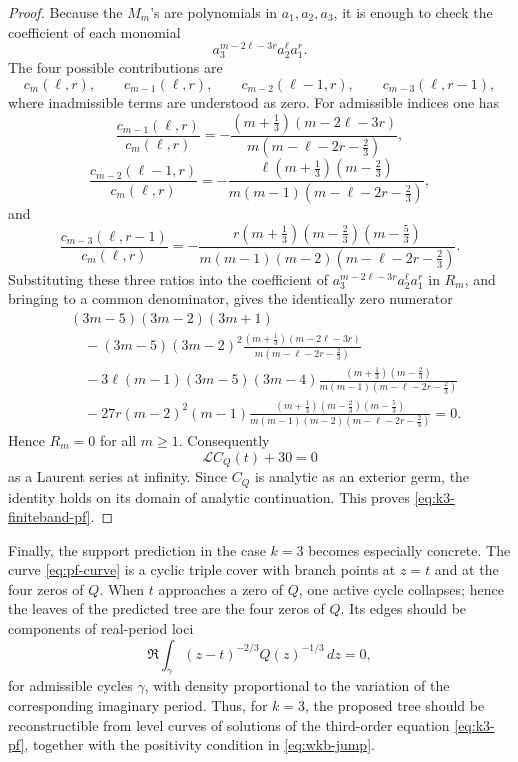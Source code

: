 \documentclass[10pt,twoside,a4paper,reqno]{amsart}
\theoremstyle{plain}
\theoremstyle{definition}
\theoremstyle{remark}
\begin{document}
\begin{proof}
Because the \(M_m\)'s are polynomials in \(a_1,a_2,a_3\), it is enough to check
the coefficient of each monomial
\[
        a_3^{m-2\ell-3r}a_2^\ell a_1^r .
\]
The four possible contributions are
\[
        c_m(\ell,r),\qquad
        c_{m-1}(\ell,r),\qquad
        c_{m-2}(\ell-1,r),\qquad
        c_{m-3}(\ell,r-1),
\]
where inadmissible terms are understood as zero.  For admissible indices one has
\[
        \frac{c_{m-1}(\ell,r)}{c_m(\ell,r)}
        =
        -\frac{(m+\frac13)(m-2\ell-3r)}
        {m(m-\ell-2r-\frac23)},
\]
\[
        \frac{c_{m-2}(\ell-1,r)}{c_m(\ell,r)}
        =
        -\frac{\ell(m+\frac13)(m-\frac23)}
        {m(m-1)(m-\ell-2r-\frac23)},
\]
and
\[
        \frac{c_{m-3}(\ell,r-1)}{c_m(\ell,r)}
        =
        -\frac{r(m+\frac13)(m-\frac23)(m-\frac53)}
        {m(m-1)(m-2)(m-\ell-2r-\frac23)} .
\]
Substituting these three ratios into the coefficient of
\(a_3^{m-2\ell-3r}a_2^\ell a_1^r\) in \(R_m\), and bringing to a common
denominator, gives the identically zero numerator
\[
\begin{split}
& (3m-5)(3m-2)(3m+1) \\
&\quad
-(3m-5)(3m-2)^2
        \frac{(m+\frac13)(m-2\ell-3r)}
        {m(m-\ell-2r-\frac23)} \\
&\quad
-3\ell(m-1)(3m-5)(3m-4)
        \frac{(m+\frac13)(m-\frac23)}
        {m(m-1)(m-\ell-2r-\frac23)} \\
&\quad
-27r(m-2)^2(m-1)
        \frac{(m+\frac13)(m-\frac23)(m-\frac53)}
        {m(m-1)(m-2)(m-\ell-2r-\frac23)}
        =0 .
\end{split}
\]
Hence \(R_m=0\) for all \(m\ge1\).  Consequently
\[
        \mathcal L C_Q(t)+30=0
\]
as a Laurent series at infinity.  Since \(C_Q\) is analytic as an exterior germ,
the identity holds on its domain of analytic continuation.  This proves
\eqref{eq:k3-finiteband-pf}.
\end{proof}




Finally, the support prediction in the case $k=3$ becomes especially concrete.  The
curve \eqref{eq:pf-curve} is a cyclic triple cover with branch points at $z=t$ and
at the four zeros of $Q$.  When $t$ approaches a zero of $Q$, one active cycle
collapses; hence the leaves of the predicted tree are the four zeros of $Q$.  Its
edges should be components of real-period loci
\begin{equation}
\label{eq:k3-period-locus}
        \Re \int_\gamma (z-t)^{-2/3}Q(z)^{-1/3}\,dz=0,
\end{equation}
for admissible cycles $\gamma$, with density proportional to the variation of the
corresponding imaginary period.  Thus, for $k=3$, the proposed tree should be
reconstructible from level curves of solutions of the third-order equation
\eqref{eq:k3-pf}, together with the positivity condition in \eqref{eq:wkb-jump}.
\end{document}
